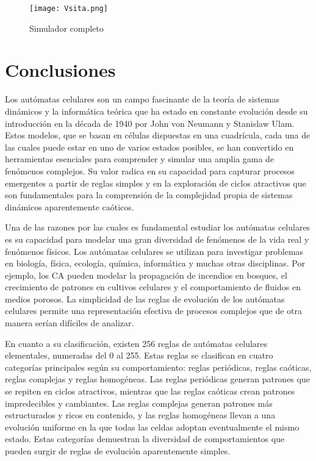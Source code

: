 \documentclass{article}
\begin{document}
	\begin{figure}[h]
		\centering       
		\texttt{[image: Vsita.png]}
		\caption{Simulador completo}
		\label{fig:mi_imagen1}
	\end{figure}
	\vspace{300pt}
	\section{Conclusiones}
	
	Los autómatas celulares son un campo fascinante de la teoría de sistemas dinámicos y la informática teórica que ha estado en constante evolución desde su introducción en la década de 1940 por John von Neumann y Stanislaw Ulam. Estos modelos, que se basan en células dispuestas en una cuadrícula, cada una de las cuales puede estar en uno de varios estados posibles, se han convertido en herramientas esenciales para comprender y simular una amplia gama de fenómenos complejos. Su valor radica en su capacidad para capturar procesos emergentes a partir de reglas simples y en la exploración de ciclos atractivos que son fundamentales para la comprensión de la complejidad propia de sistemas dinámicos aparentemente caóticos.
	
	Una de las razones por las cuales es fundamental estudiar los autómatas celulares es su capacidad para modelar una gran diversidad de fenómenos de la vida real y fenómenos físicos. Los autómatas celulares se utilizan para investigar problemas en biología, física, ecología, química, informática y muchas otras disciplinas. Por ejemplo, los CA pueden modelar la propagación de incendios en bosques, el crecimiento de patrones en cultivos celulares y el comportamiento de fluidos en medios porosos. La simplicidad de las reglas de evolución de los autómatas celulares permite una representación efectiva de procesos complejos que de otra manera serían difíciles de analizar.
	
	En cuanto a su clasificación, existen 256 reglas de autómatas celulares elementales, numeradas del 0 al 255. Estas reglas se clasifican en cuatro categorías principales según su comportamiento: reglas periódicas, reglas caóticas, reglas complejas y reglas homogéneas. Las reglas periódicas generan patrones que se repiten en ciclos atractivos, mientras que las reglas caóticas crean patrones impredecibles y cambiantes. Las reglas complejas generan patrones más estructurados y ricos en contenido, y las reglas homogéneas llevan a una evolución uniforme en la que todas las celdas adoptan eventualmente el mismo estado. Estas categorías demuestran la diversidad de comportamientos que pueden surgir de reglas de evolución aparentemente simples.
	
\end{document}

